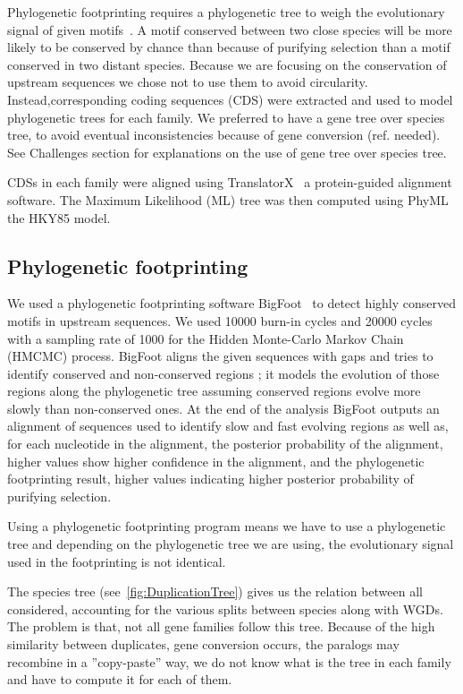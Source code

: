 Phylogenetic footprinting requires a phylogenetic tree to weigh the evolutionary signal of given motifs~\citep{zhang_mice_2003}. A motif conserved between two close species will be more likely to be conserved by chance than because of purifying selection than a motif conserved in two distant species. Because we are focusing on the conservation of upstream sequences we chose not to use them to avoid circularity. Instead,corresponding coding sequences (CDS) were extracted and used to model phylogenetic trees for each family. We preferred to have a gene tree over species tree, to avoid eventual inconsistencies because of gene conversion (ref. needed). See Challenges section for explanations on the use of gene tree over species tree.

CDSs in each family were aligned using TranslatorX~\citep{abascal_translatorx:_2010} a protein-guided alignment software. The Maximum Likelihood (ML) tree was then computed using PhyML~\citep{guindon_new_2010} the HKY85 model.

\subsection*{Phylogenetic footprinting}

We used a phylogenetic footprinting software BigFoot~\citep{satija_bigfoot:_2009} to detect highly conserved motifs in upstream sequences. We used 10000 burn-in cycles and 20000 cycles with a sampling rate of 1000 for the Hidden Monte-Carlo Markov Chain (HMCMC) process. BigFoot aligns the given sequences with gaps and tries to identify conserved and non-conserved regions ; it models the evolution of those regions along the phylogenetic tree assuming conserved regions evolve more slowly than non-conserved ones. At the end of the analysis BigFoot outputs an alignment of sequences used to identify slow and fast evolving regions as well as, for each nucleotide in the alignment, the posterior probability of the alignment, higher values show higher confidence in the alignment, and the phylogenetic footprinting result, higher values indicating higher posterior probability of purifying selection.

Using a phylogenetic footprinting program means we have to use a phylogenetic tree and depending on the phylogenetic tree we are using, the evolutionary signal used in the footprinting is not identical.

The species tree (see~\autoref{fig:DuplicationTree}) gives us the relation between all considered, accounting for the various splits between species along with WGDs. The problem is that, not all gene families follow this tree. Because of the high similarity between duplicates, gene conversion occurs, the paralogs may recombine in a ''copy-paste'' way, we do not know what is the tree in each family and have to compute it for each of them.

